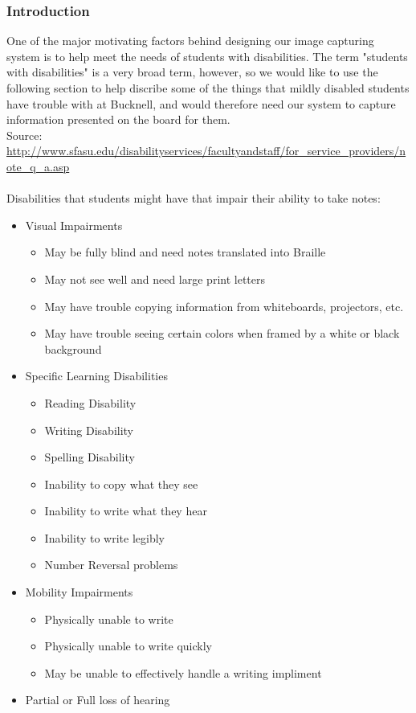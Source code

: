 \documentclass{article}
\begin{document}
        \subsubsection*{Introduction}
One of the major motivating factors behind designing our image capturing system is to help meet the needs of students with disabilities. The term "students with disabilities" is a very broad term, however, so we would like to use the following section to help discribe some of the things that mildly disabled students have trouble with at Bucknell, and would therefore need our system to capture information presented on the board for them.
\\
Source: \\
{\color{red} \url{http://www.sfasu.edu/disabilityservices/facultyandstaff/for_service_providers/note_q_a.asp}} \\
\\
Disabilities that students might have that impair their ability to take notes:
    \begin{itemize}
        \item Visual Impairments
        \begin{itemize}
            \item May be fully blind and need notes translated into Braille
            \item May not see well and need large print letters
            \item May have trouble copying information from whiteboards, projectors, etc.
            \item May have trouble seeing certain colors when framed by a white or black background
        \end{itemize}
        \item Specific Learning Disabilities
        \begin{itemize}
            \item Reading Disability
            \item Writing Disability
            \item Spelling Disability
            \item Inability to copy what they see
            \item Inability to write what they hear
            \item Inability to write legibly
            \item Number Reversal problems
        \end{itemize}
        \item Mobility Impairments
        \begin{itemize}
            \item Physically unable to write
            \item Physically unable to write quickly
            \item May be unable to effectively handle a writing impliment
        \end{itemize}
        \item Partial or Full loss of hearing
    \end{itemize}
\end{document}
